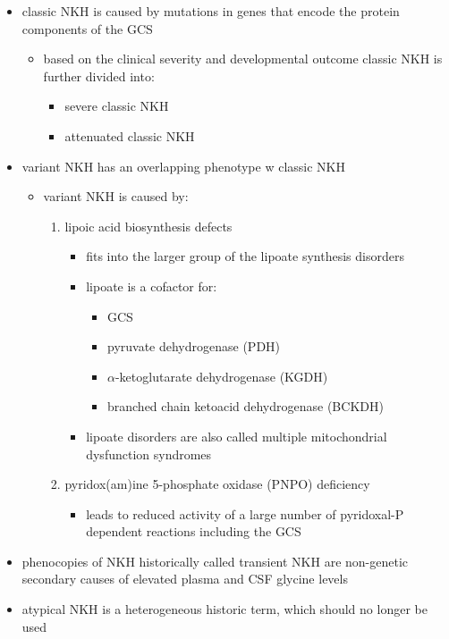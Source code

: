 \documentclass[12pt]{scrartcl}
\begin{document}
\begin{center}
\begin{center}
\begin{itemize}
\item classic NKH is caused by mutations in genes that encode the protein
components of the GCS
\begin{itemize}
\item based on the clinical severity and developmental outcome classic
NKH is further divided into:
\begin{itemize}
\item severe classic NKH
\item attenuated classic NKH
\end{itemize}
\end{itemize}
\item variant NKH has an overlapping phenotype w classic NKH
\begin{itemize}
\item variant NKH is caused by: 
\begin{enumerate}
\item lipoic acid biosynthesis defects
\begin{itemize}
\item fits into the larger group of the lipoate synthesis
disorders
\item lipoate is a cofactor for:
\begin{itemize}
\item GCS
\item pyruvate dehydrogenase (PDH)
\item \(\alpha\)-ketoglutarate dehydrogenase (KGDH)
\item branched chain ketoacid dehydrogenase (BCKDH)
\end{itemize}
\item lipoate disorders are also called multiple mitochondrial dysfunction
syndromes
\end{itemize}
\item pyridox(am)ine 5-phosphate oxidase (PNPO) deficiency
\begin{itemize}
\item leads to reduced activity of a large number of
pyridoxal-P dependent reactions including the GCS
\end{itemize}
\end{enumerate}
\end{itemize}
\item phenocopies of NKH historically called transient NKH are non-genetic
secondary causes of elevated plasma and CSF glycine levels
\item atypical NKH is a heterogeneous historic term, which should no
longer be used
\end{itemize}


\end{center}
\end{center}
\end{document}
